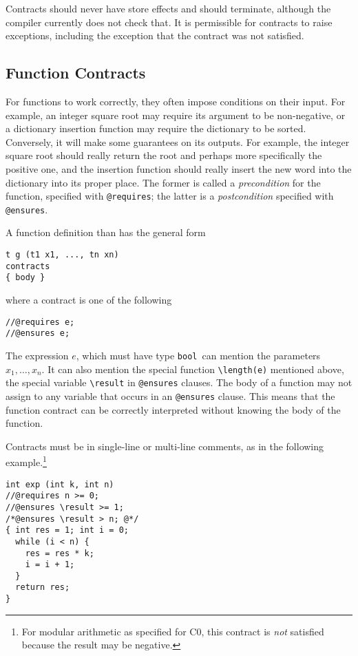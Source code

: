 \documentclass[11pt]{article}
\newcommand{\tbool}{\texttt{bool}}
\begin{document}
Contracts should never have store effects and should terminate,
although the compiler currently does not check that.  It is
permissible for contracts to raise exceptions, including the exception
that the contract was not satisfied.

\subsection{Function Contracts}

For functions to work correctly, they often impose conditions on their
input.  For example, an integer square root may require its argument
to be non-negative, or a dictionary insertion function may require
the dictionary to be sorted.  Conversely, it will make some guarantees
on its outputs.  For example, the integer square root should really
return the root and perhaps more specifically the positive one, and
the insertion function should really insert the new word into the
dictionary into its proper place.  The former is called a
\emph{precondition} for the function, specified with \verb'@requires';
the latter is a \emph{postcondition} specified with \verb'@ensures'.

A function definition than has the general form
\begin{verbatim}
t g (t1 x1, ..., tn xn)
contracts
{ body }
\end{verbatim}
where a contract is one of the following
\begin{verbatim}
//@requires e;
//@ensures e;
\end{verbatim}
The expression $e$, which must have type \tbool\ can mention the
parameters $x_1, \ldots, x_n$.  It can also mention the special
function \verb'\length(e)' mentioned above, the special variable
\verb'\result' in \verb'@ensures' clauses.  The body of a function may
not assign to any variable that occurs in an \verb'@ensures' clause.
This means that the function contract can be correctly interpreted
without knowing the body of the function.

Contracts must be in single-line or multi-line comments, as in the
following example.\footnote{For modular arithmetic as specified
for C0, this contract is \emph{not} satisfied because the result may be
negative.}
\begin{verbatim}
int exp (int k, int n)
//@requires n >= 0;
//@ensures \result >= 1;
/*@ensures \result > n; @*/
{ int res = 1; int i = 0;
  while (i < n) {
    res = res * k;
    i = i + 1;
  }
  return res;
}
\end{verbatim}
\end{document}
